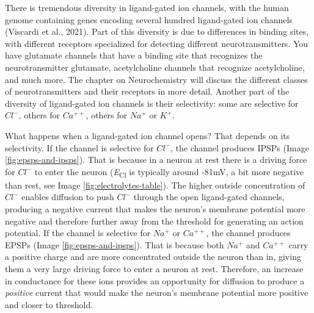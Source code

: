 \documentclass[
]{book}
\begin{document}
There is tremendous diversity in ligand-gated ion channels, with the human genome containing genes encoding several hundred ligand-gated ion channels (Viscardi et al., 2021). Part of this diversity is due to differences in binding sites, with different receptors specialized for detecting different neurotransmitters. You have glutamate channels that have a binding site that recognizes the neurotransmitter glutamate, acetylcholine channels that recognize acetylcholine, and much more. The chapter on Neurochemistry will discuss the different classes of neurotransmitters and their receptors in more detail. Another part of the diversity of ligand-gated ion channels is their selectivity: some are selective for \(Cl^{-}\), others for \(Ca^{++}\), others for \(Na^+\) or \(K^+\).

What happens when a ligand-gated ion channel opens? That depends on its selectivity. If the channel is selective for \(Cl^{-}\), the channel produces IPSPs (Image \ref{fig:epsps-and-ipsps}). That is because in a neuron at rest there is a driving force for \(Cl^{-}\) to enter the neuron (\emph{E}\textsubscript{Cl} is typically around -81mV, a bit more negative than rest, see Image \ref{fig:electrolytes-table}). The higher outside concentration of \(Cl^{-}\) enables diffusion to push \(Cl^{-}\) through the open ligand-gated channels, producing a negative current that makes the neuron's membrane potential more negative and therefore further away from the threshold for generating an action potential. If the channel is selective for \(Na^+\) or \(Ca^{++}\), the channel produces EPSPs (Image \ref{fig:epsps-and-ipsps}). That is because both \(Na^+\) and \(Ca^{++}\) carry a positive charge and are more concentrated outside the neuron than in, giving them a very large driving force to enter a neuron at rest. Therefore, an increase in conductance for these ions provides an opportunity for diffusion to produce a \emph{positive} current that would make the neuron's membrane potential more positive and closer to threshold.
\end{document}
